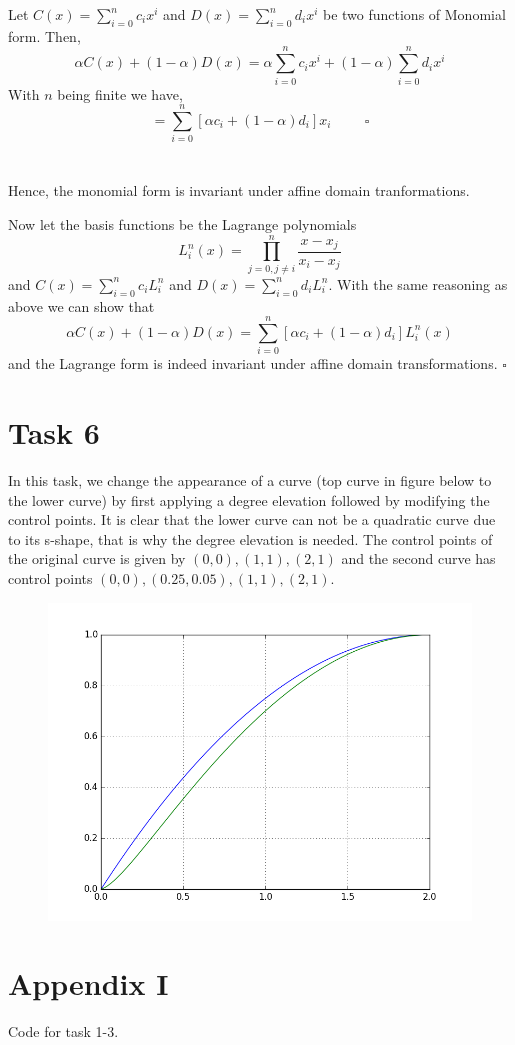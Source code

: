 \documentclass[]{article}
\begin{document}
Let $C(x)=\sum_{i=0}^{n}c_ix^i$ and $D(x)=\sum_{i=0}^{n}d_ix^i$ be two functions of Monomial form. Then, $$\alpha C(x) + (1-\alpha)D(x)=\alpha\sum_{i=0}^{n}c_ix^i + (1-\alpha)\sum_{i=0}^{n}d_ix^i$$
With $n$ being finite we have,
$$=\sum_{i=0}^{n}[\alpha c_i+(1-\alpha)d_i]x_i\hspace{1cm}\square$$ \\
\\
Hence, the monomial form is invariant under affine domain tranformations. 

Now let the basis functions be the Lagrange polynomials $$L_i^n(x)=\prod_{j=0, j\neq i}^{n}\frac{x-x_j}{x_i-x_j}$$ and $C(x)=\sum_{i=0}^{n}c_iL_i^n$ and $D(x)=\sum_{i=0}^{n}d_iL_i^n$. With the same reasoning as above we can show that 
$$\alpha C(x) + (1-\alpha)D(x)=\sum_{i=0}^{n}[\alpha c_i+(1-\alpha)d_i]L_i^n(x)$$
and the Lagrange form is indeed invariant under affine domain transformations. $\square$

\section*{Task 6}
In this task, we change the appearance of a curve (top curve in figure below to the lower curve) by first applying a degree elevation followed by modifying the control points. It is clear that the lower curve can not be a quadratic curve due to its s-shape, that is why the degree elevation is needed. The control points of the original curve is given by $(0, 0), (1, 1), (2, 1)$ and the second curve has control points $(0, 0), (0.25, 0.05), (1, 1), (2, 1)$.

\newpage
\begin{figure}[h!]
	\includegraphics[scale=0.6]{non_symmetric_degree_elevation}
\end{figure}


\newpage
\section*{Appendix I}
Code for task 1-3.

\end{document}
